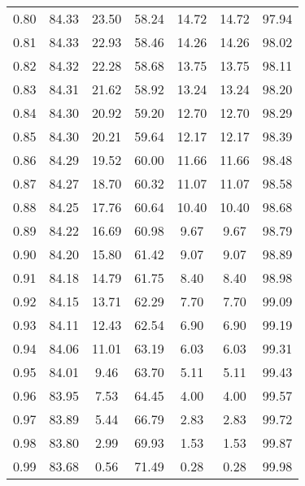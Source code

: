 \begin{tabular}{|c|c|c|c|c|c|c|}
      0.80 &     84.33 &     23.50 &      58.24 &   14.72 &      14.72 &         97.94 \\
      0.81 &     84.33 &     22.93 &      58.46 &   14.26 &      14.26 &         98.02 \\
      0.82 &     84.32 &     22.28 &      58.68 &   13.75 &      13.75 &         98.11 \\
      0.83 &     84.31 &     21.62 &      58.92 &   13.24 &      13.24 &         98.20 \\
      0.84 &     84.30 &     20.92 &      59.20 &   12.70 &      12.70 &         98.29 \\
      0.85 &     84.30 &     20.21 &      59.64 &   12.17 &      12.17 &         98.39 \\
      0.86 &     84.29 &     19.52 &      60.00 &   11.66 &      11.66 &         98.48 \\
      0.87 &     84.27 &     18.70 &      60.32 &   11.07 &      11.07 &         98.58 \\
      0.88 &     84.25 &     17.76 &      60.64 &   10.40 &      10.40 &         98.68 \\
      0.89 &     84.22 &     16.69 &      60.98 &    9.67 &       9.67 &         98.79 \\
      0.90 &     84.20 &     15.80 &      61.42 &    9.07 &       9.07 &         98.89 \\
      0.91 &     84.18 &     14.79 &      61.75 &    8.40 &       8.40 &         98.98 \\
      0.92 &     84.15 &     13.71 &      62.29 &    7.70 &       7.70 &         99.09 \\
      0.93 &     84.11 &     12.43 &      62.54 &    6.90 &       6.90 &         99.19 \\
      0.94 &     84.06 &     11.01 &      63.19 &    6.03 &       6.03 &         99.31 \\
      0.95 &     84.01 &      9.46 &      63.70 &    5.11 &       5.11 &         99.43 \\
      0.96 &     83.95 &      7.53 &      64.45 &    4.00 &       4.00 &         99.57 \\
      0.97 &     83.89 &      5.44 &      66.79 &    2.83 &       2.83 &         99.72 \\
      0.98 &     83.80 &      2.99 &      69.93 &    1.53 &       1.53 &         99.87 \\
      0.99 &     83.68 &      0.56 &      71.49 &    0.28 &       0.28 &         99.98 \\
\bottomrule
\end{tabular}
